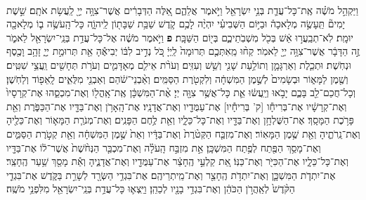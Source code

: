 \documentclass[twoside, openany, parskip=half, 11pt]{book}
\begin{document}
\begin{footnotesize}
\begin{multicols}{2}
\\
 וַיַּקְהֵ֣ל מֹשֶׁ֗ה אֶֽת־כָּל־עֲדַ֛ת בְּנֵ֥י יִשְׂרָאֵ֖ל וַיֹּ֣אמֶר אֲלֵהֶ֑ם אֵ֚לֶּה הַדְּבָרִ֔ים אֲשֶׁר־צִוָּ֥ה יְיָ֖ לַֽעֲשׂ֥ת אֹתָֽם׃ שֵׁ֣שֶׁת יָמִים֘ תֵּֽעָשֶׂ֣ה מְלָאכָה֒ וּבַיּ֣וֹם הַשְּׁבִיעִ֗י יִהְיֶ֨ה לָכֶ֥ם קֹ֛דֶשׁ שַׁבַּ֥ת שַׁבָּת֖וֹן לַֽיהוָֹ֑ה כָּל־הָֽעֹשֶׂ֥ה ב֛וֹ מְלָאכָ֖ה יוּמָֽת׃ לֹֽא־תְבַֽעֲר֣וּ אֵ֔שׁ בְּכֹ֖ל מֽשְׁבֹֽתֵיכֶ֑ם בְּי֖וֹם הַשַּׁבָּֽת׃ \textbf{פ} 
וַיֹּ֣אמֶר מֹשֶׁ֔ה אֶל־כָּל־עֲדַ֥ת בְּנֵֽי־יִשְׂרָאֵ֖ל לֵאמֹ֑ר זֶ֣ה הַדָּבָ֔ר אֲשֶׁר־צִוָּ֥ה יְיָ֖ לֵאמֹֽר׃ קְח֨וּ מֵֽאִתְּכֶ֤ם תְּרוּמָה֙ לַֽיְיָ֔ כֹּ֚ל נְדִ֣יב לִבּ֔וֹ יְבִיאֶ֕הָ אֵ֖ת תְּרוּמַ֣ת יְיָ֑ זָהָ֥ב וָכֶ֖סֶף וּנְחֹֽשֶׁת׃ וּתְכֵ֧לֶת וְאַרְגָּמָ֛ן וְתוֹלַ֥עַת שָׁנִ֖י וְשֵׁ֥שׁ וְעִזִּֽים׃ וְעֹרֹ֨ת אֵילִ֧ם מְאָדָּמִ֛ים וְעֹרֹ֥ת תְּחָשִׁ֖ים וַֽעֲצֵ֥י שִׁטִּֽים׃ וְשֶׁ֖מֶן לַמָּא֑וֹר וּבְשָׂמִים֙ לְשֶׁ֣מֶן הַמִּשְׁחָ֔ה וְלִקְטֹ֖רֶת הַסַּמִּֽים׃ וְאַ֨בְנֵי־שֹׁ֔הַם וְאַבְנֵ֖י מִלֻּאִ֑ים לָֽאֵפ֖וֹד וְלַחֹֽשֶׁן׃ וְכָל־חֲכַם־לֵ֖ב בָּכֶ֑ם יָבֹ֣אוּ וְיַֽעֲשׂ֔וּ אֵ֛ת כָּל־אֲשֶׁ֥ר צִוָּ֖ה יְיָ׃ 
אֶ֨ת־הַמִּשְׁכָּ֔ן אֶֽת־אָֽהֳל֖וֹ וְאֶת־מִכְסֵ֑הוּ אֶת־קְרָסָיו֙ וְאֶת־קְרָשָׁ֔יו אֶת־בְּרִיחָ֕ו [ק' בְּרִיחָ֕יו] אֶת־עַמֻּדָ֖יו וְאֶת־אֲדָנָֽיו׃ אֶת־הָֽאָרֹ֥ן וְאֶת־בַּדָּ֖יו אֶת־הַכַּפֹּ֑רֶת וְאֵ֖ת פָּרֹ֥כֶת הַמָּסָֽךְ׃ אֶת־הַשֻּׁלְחָ֥ן וְאֶת־בַּדָּ֖יו וְאֶת־כָּל־כֵּלָ֑יו וְאֵ֖ת לֶ֥חֶם הַפָּנִֽים׃ וְאֶת־מְנֹרַ֧ת הַמָּא֛וֹר וְאֶת־כֵּלֶ֖יהָ וְאֶת־נֵֽרֹתֶ֑יהָ וְאֵ֖ת שֶׁ֥מֶן הַמָּאֽוֹר׃ וְאֶת־מִזְבַּ֤ח הַקְּטֹ֨רֶת֙ וְאֶת־בַּדָּ֔יו וְאֵת֙ שֶׁ֣מֶן הַמִּשְׁחָ֔ה וְאֵ֖ת קְטֹ֣רֶת הַסַּמִּ֑ים וְאֶת־מָסַ֥ךְ הַפֶּ֖תַח לְפֶ֥תַח הַמִּשְׁכָּֽן׃ אֵ֣ת מִזְבַּ֣ח הָֽעֹלָ֗ה וְאֶת־מִכְבַּ֤ר הַנְּחֹ֨שֶׁת֙ אֲשֶׁר־ל֔וֹ אֶת־בַּדָּ֖יו וְאֶת־כָּל־כֵּלָ֑יו אֶת־הַכִּיֹּ֖ר וְאֶת־כַּנּֽוֹ׃ אֵ֚ת קַלְעֵ֣י הֶֽחָצֵ֔ר אֶת־עַמֻּדָ֖יו וְאֶת־אֲדָנֶ֑יהָ וְאֵ֕ת מָסַ֖ךְ שַׁ֥עַר הֶֽחָצֵֽר׃ אֶת־יִתְדֹ֧ת הַמִּשְׁכָּ֛ן וְאֶת־יִתְדֹ֥ת הֶֽחָצֵ֖ר וְאֶת־מֵֽיתְרֵיהֶֽם׃ אֶת־בִּגְדֵ֥י הַשְּׂרָ֖ד לְשָׁרֵ֣ת בַּקֹּ֑דֶשׁ אֶת־בִּגְדֵ֤י הַקֹּ֨דֶשׁ֙ לְאַֽהֲרֹ֣ן הַכֹּהֵ֔ן וְאֶת־בִּגְדֵ֥י בָנָ֖יו לְכַהֵֽן׃ וַיֵּֽצְא֛וּ כָּל־עֲדַ֥ת בְּנֵֽי־יִשְׂרָאֵ֖ל מִלִּפְנֵ֥י מֹשֶֽׁה׃


\end{multicols}
\end{footnotesize}
\end{document}
